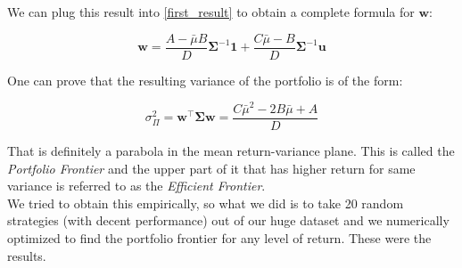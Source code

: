 We can plug this result into \eqref{first_result} to obtain a complete formula for $\mathbf{w}$:

\begin{equation} \label{final_result}
\mathbf{w} = \frac{A - \bar{\mu}B}{D}\mathbf{\Sigma}^{-1}\mathbf{1} + \frac{C\bar{\mu} - B}{D}\mathbf{\Sigma}^{-1}\mathbf{u}
\end{equation}

One can prove that the resulting variance of the portfolio is of the form:

\begin{equation} \label{N_portfolio_variance}
\sigma^2_{\Pi} = \mathbf{w}^\top \mathbf{\Sigma}\mathbf{w} = \frac{C\bar{\mu}^2 - 2B\bar{\mu} + A}{D}
\end{equation}

That is definitely a parabola in the mean return-variance plane. This is called the \textit{Portfolio Frontier} and the upper part of it that has higher return for same variance is referred to as the \textit{Efficient Frontier}.\\
We tried to obtain this empirically, so what we did is to take 20 random strategies (with decent performance) out of our huge dataset and we numerically optimized to find the portfolio frontier for any level of return. These were the results.